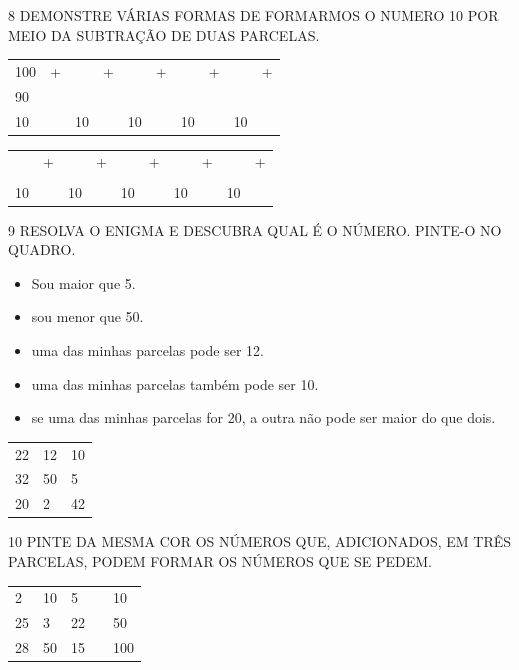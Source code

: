 
\num{8} DEMONSTRE VÁRIAS FORMAS DE FORMARMOS O NUMERO 10 POR MEIO DA SUBTRAÇÃO DE
DUAS PARCELAS.

\begin{longtable}[]{@{}llllllllll@{}}
\toprule
100 & + & & + & & + & & + & & +\tabularnewline
90 & & & & & & & & &\tabularnewline
10 & & 10 & & 10 & & 10 & & 10 &\tabularnewline
\bottomrule
\end{longtable}

\begin{longtable}[]{@{}llllllllll@{}}
\toprule
& + & & + & & + & & + & & +\tabularnewline
& & & & & & & & &\tabularnewline
10 & & 10 & & 10 & & 10 & & 10 &\tabularnewline
\bottomrule
\end{longtable}


\num{9} RESOLVA O ENIGMA E DESCUBRA QUAL É O NÚMERO. PINTE-O NO QUADRO.

\begin{itemize}
\item Sou maior que 5.

\item sou menor que 50.

\item uma das minhas parcelas pode ser 12.

\item uma das minhas parcelas também pode ser 10.

\item se uma das minhas parcelas for 20, a outra não pode ser maior do que dois.
\end{itemize}

\begin{longtable}[]{@{}lll@{}}
\toprule
22 & 12 & 10\tabularnewline
32 & 50 & 5\tabularnewline
20 & 2 & 42\tabularnewline
\bottomrule
\end{longtable}


\num{10} PINTE DA MESMA COR OS NÚMEROS QUE, ADICIONADOS, EM TRÊS PARCELAS, PODEM
FORMAR OS NÚMEROS QUE SE PEDEM.

\begin{longtable}[]{@{}lllll@{}}
\toprule
2 & 10 & 5 & & 10\tabularnewline
25 & 3 & 22 & & 50\tabularnewline
28 & 50 & 15 & & 100\tabularnewline
\bottomrule
\end{longtable}

